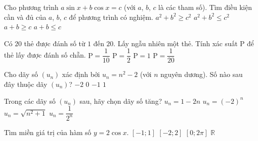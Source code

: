 \begin{ex}%
Cho phương trình $a\sin x+b\cos x=c$ (với $a$, $b$, $c$ là các tham số). Tìm điều kiện cần và đủ của $a$, $b$, $c$ để phương trình có nghiệm.
\choice
{\True $a^2+b^2\ge c^2$}
{$a^2+b^2\le c^2$}
{$a+b\ge c$}
{$a+b\le c$}
\end{ex}

\begin{ex}%
Có $20$ thẻ được đánh số từ $1$ đến $20$. Lấy ngẫu nhiên một thẻ. Tính xác suất $\mathrm{P}$ để thẻ lấy được đánh số chẵn.
\choice
{$\mathrm{P}=\dfrac{1}{10}$}
{\True $\mathrm{P}=\dfrac{1}{2}$}
{$\mathrm{P}=1$}
{$\mathrm{P}=\dfrac{1}{20}$}
\end{ex}

\begin{ex}%
Cho dãy số $\left(u_n\right)$ xác định bởi $u_n=n^2-2$ (với $n$ nguyên dương). Số nào sau đây thuộc dãy $\left(u_n\right)$?
\choice
{$-2$}
{$0$}
{\True $-1$}
{$1$}
\end{ex}

\begin{ex}%
Trong các dãy số $\left(u_n\right)$ sau, hãy chọn dãy số tăng?
\choice
{$u_n=1-2n$}
{$u_n=\left(-2\right)^n$}
{\True $u_n=\sqrt{n^2+1}$}
{$u_n=\dfrac{1}{2^n}$}
\end{ex}

\begin{ex}%
Tìm miền giá trị của hàm số $y=2\cos x$.
\choice
{$\left[-1;1\right]$}
{\True $\left[-2;2\right]$}
{$\left[0;2\pi \right]$}
{$\mathbb{R}$}
\end{ex}

